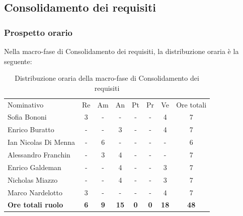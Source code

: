 \documentclass[../piano-di-progetto.tex]{subfiles}
\begin{document}
  \subsection{Consolidamento dei requisiti}

  \subsubsection{Prospetto orario}
  Nella macro-fase di Consolidamento dei requisiti, la distribuzione oraria è la seguente:
  \begin{table}[H]
    \centering
    \begin{tabular}{lccccccc}
      Nominativo                & Re         & Am         & An          & Pt         & Pr         & Ve          & Ore totali  \\
      Sofia Bononi              & 3          & -          & -           & -          & -          & 4           & 7           \\
      Enrico Buratto            & -          & -          & 3           & -          & -          & 4           & 7           \\
      Ian Nicolas Di Menna      & -          & 6          & -           & -          & -          & -           & 6           \\
      Alessandro Franchin       & -          & 3          & 4           & -          & -          & -           & 7           \\
      Enrico Galdeman           & -          & -          & 4           & -          & -          & 3           & 7           \\
      Nicholas Miazzo           & -          & -          & 4           & -          & -          & 3           & 7           \\
      Marco Nardelotto          & 3          & -          & -           & -          & -          & 4           & 7           \\
      \textbf{Ore totali ruolo} & \textbf{6} & \textbf{9} & \textbf{15} & \textbf{0} & \textbf{0} & \textbf{18} & \textbf{48}
      
    \end{tabular}
    \caption{Distribuzione oraria della macro-fase di Consolidamento dei requisiti}
  \end{table}
\end{document}
